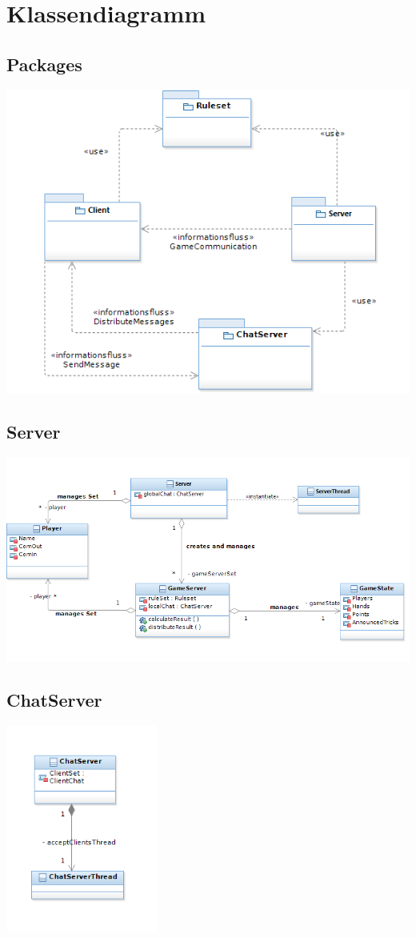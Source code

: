 \documentclass{article}
\begin{document}
\section{Klassendiagramm}
\subsection{Packages}
\includegraphics[width=\textwidth]{Packages}
\subsection{Server}
\includegraphics[width=\textwidth]{Server}
\subsection{ChatServer}
\includegraphics[width=5cm]{ChatServer}
\end{document}
